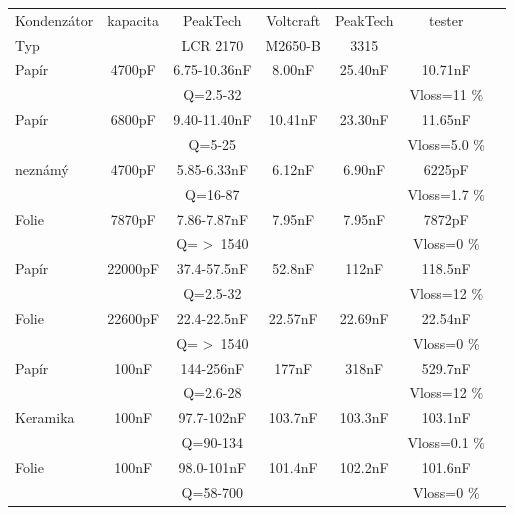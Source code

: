 \begin{tabular}{| l | c | c | c | c | c | c |}
   \hline
Kondenzátor & kapacita      & PeakTech     & Voltcraft & PeakTech & tester \\
Typ        &   & LCR 2170     & M2650-B   &  3315    &       \\
    \hline
    \hline
Papír     & 4700pF      & 6.75-10.36nF & 8.00nF    &  25.40nF &  10.71nF   \\
           &             &  Q=2.5-32    &           &          &  Vloss=11 \% \\
    \hline
Papír     & 6800pF      & 9.40-11.40nF & 10.41nF   &  23.30nF &  11.65nF  \\
           &             &  Q=5-25      &           &          &  Vloss=5.0 \% \\
    \hline
neznámý  & 4700pF      & 5.85-6.33nF  & 6.12nF    &  6.90nF  &  6225pF  \\
           &             &  Q=16-87     &           &          &  Vloss=1.7 \% \\
    \hline
Folie      & 7870pF      & 7.86-7.87nF  & 7.95nF    &  7.95nF  &  7872pF  \\
           &             &  Q= \textgreater~1540    &           &          &  Vloss=0 \% \\
    \hline
Papír     & 22000pF     & 37.4-57.5nF  & 52.8nF    &  112nF   &  118.5nF \\
           &             &  Q=2.5-32    &           &          &  Vloss=12 \% \\
    \hline
Folie      & 22600pF     & 22.4-22.5nF  & 22.57nF   & 22.69nF  &  22.54nF \\
           &             & Q= \textgreater~1540     &           &          &  Vloss=0 \% \\
    \hline
Papír     & 100nF       & 144-256nF    & 177nF     &  318nF   &  529.7nF \\
           &             & Q=2.6-28     &           &          &  Vloss=12 \% \\
    \hline
Keramika  & 100nF       & 97.7-102nF   & 103.7nF   & 103.3nF  &  103.1nF \\
           &             & Q=90-134     &           &          &  Vloss=0.1 \% \\
    \hline
Folie      & 100nF       & 98.0-101nF   & 101.4nF   & 102.2nF  &  101.6nF \\
           &             & Q=58-700     &           &          &  Vloss=0 \% \\
    \hline
\end{tabular}
\vspace{0.5 cm}


